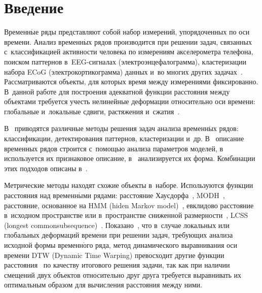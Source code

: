 
  
\vspace*{-3pt}



\thispagestyle{headings}

\begin{multicols}{2}

\label{st\stat}


\section{Введение}

Временн$\acute{\mbox{ы}}$е ряды представляют собой набор измерений, упорядоченных 
по оси времени. Анализ временн$\acute{\mbox{ы}}$х рядов производится при решении задач, 
связанных с~классификацией активности человека по измерениям акселерометра 
телефона, поиском паттернов в~EEG-сиг\-на\-лах (электроэнцефалограмма), 
кластеризации набора ECoG (электрокортикограмма) данных и~во многих других 
задачах~\cite{0}. Рассматриваются объекты, для которых время между измерениями 
фиксированно. В~данной работе для построения адекватной функции 
расстояния между объектами требуется учесть нелинейные деформации 
относительно оси времени: глобальные и~локальные сдвиги, растяжения 
и~сжатия~\cite{1}.

В~\cite{2} приводятся различные методы решения задач анализа 
временн$\acute{\mbox{ы}}$х рядов: классификации, детектирования паттернов, 
кластеризации и~др. В~\cite{3} описание временных рядов 
строится с~по\-мощью анализа параметров моделей, в~\cite{4} 
используется их признаковое описание, в~\cite{5} анализируется их форма. 
Комбинации этих подходов описаны в~\cite{2}.

Метрические методы находят схожие объекты в~наборе. Используются 
функции расстояния над временн$\acute{\mbox{ы}}$ми рядами: расстояние Хаусдорфа~\cite{10}, 
MODH~\cite{11}, расстояние, основанное на HMM
(hiden Markov model)~\cite{6}, евклидово расстояние 
в~исходном пространстве или в~пространстве сниженной размерности~\cite{5}, 
\mbox{LCSS} (longest common\linebreak subsequence)~\cite{7}. Показано~\cite{8}, что в~случае локальных или глобальных 
деформаций времени при решении задач, требующих анализа исходной формы 
временн$\acute{\mbox{о}}$го ряда, метод динамического выравнивания оси времени 
DTW (Dynamic Time Warping) 
превосходит другие функции расстояния~\cite{9} по качеству итогового 
решения задачи, так как при наличии смещений двух объектов относительно 
друг друга требуется выравнивать их оптимальным образом для вычисления 
расстояния между ними.


\end{multicols}
